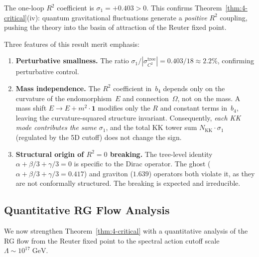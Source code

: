 \begin{proposition}\label{prop:4-sigma1}
The one-loop $R^2$ coefficient is $\sigma_1 = +0.403 > 0$. This confirms Theorem~\ref{thm:4-critical}(iv): quantum gravitational fluctuations generate a \emph{positive} $R^2$ coupling, pushing the theory into the basin of attraction of the Reuter fixed point.
\end{proposition}

Three features of this result merit emphasis:

\begin{enumerate}
  \item \textbf{Perturbative smallness.} The ratio $\sigma_1 / |\sigma_{C^2}^{\mathrm{tree}}| = 0.403 / 18 \approx 2.2\%$, confirming perturbative control.
  \item \textbf{Mass independence.} The $R^2$ coefficient in~$b_4$ depends only on the curvature of the endomorphism~$E$ and connection~$\Omega$, not on the mass. A mass shift $E \to E + m^2 \cdot \mathbf{1}$ modifies only the $R$ and constant terms in~$b_4$, leaving the curvature-squared structure invariant. Consequently, \emph{each KK mode contributes the same $\sigma_1$}, and the total KK tower sum $N_{\mathrm{KK}} \cdot \sigma_1$ (regulated by the 5D cutoff) does not change the sign.
  \item \textbf{Structural origin of $R^2 = 0$ breaking.} The tree-level identity $\alpha + \beta/3 + \gamma/3 = 0$ is specific to the Dirac operator. The ghost ($\alpha + \beta/3 + \gamma/3 = 0.417$) and graviton ($1.639$) operators both violate it, as they are not conformally structured. The breaking is expected and irreducible.
\end{enumerate}


\subsection{Quantitative RG Flow Analysis}
\label{sec:4-rg-flow}

We now strengthen Theorem~\ref{thm:4-critical} with a quantitative analysis of the RG flow from the Reuter fixed point to the spectral action cutoff scale~$\Lambda \sim 10^{17}\;\mathrm{GeV}$.

